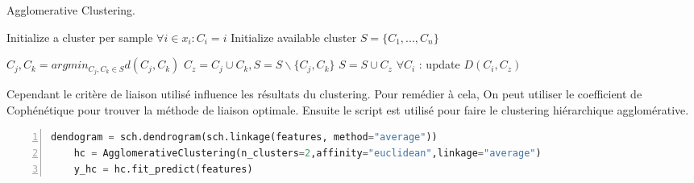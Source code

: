 \begin{algorithm}[H]
	\caption{Agglomerative Clustering.}
	\begin{algorithmic}[1]
	
		\State Initialize a cluster per sample $ \forall i \in x_{i} : C_{i} = i $
		\State Initialize available cluster $S = \{C_{1},...,C_{n}\}$
		
			\State $C_{j}, C_{k} = argmin_{C_{j},C_{k} \in S} d(C_{j}, C_{k})$  
			\State $C_{z} = C_{j} \cup C_{k}, S = S \backslash \{ C_{j},C_{k} \} $ 
				\State $S = S \cup C_{z}$
			\EndIf
			\State $\forall C_{i}$ : update $D(C_{i},C_{z})$ 
		\EndWhile 
	\EndProcedure
	
	\end{algorithmic}
\end{algorithm}

Cependant le critère de liaison utilisé influence les résultats du clustering. Pour remédier à cela, On peut utiliser le coefficient de Cophénétique pour trouver la méthode de liaison optimale. Ensuite le script est utilisé pour faire le clustering hiérarchique agglomérative.

\begin{lstlisting}[language=Python,label={pca_code}, basicstyle=\scriptsize, frame=l,framesep=4.5mm,framexleftmargin=2.5mm,tabsize=2,numbers=left,fillcolor=\color{blueforest!70},rulecolor=\color{blueforest},numberstyle=\normalfont\tiny\color{white}]
	dendogram = sch.dendrogram(sch.linkage(features, method="average"))
	hc = AgglomerativeClustering(n_clusters=2,affinity="euclidean",linkage="average")
	y_hc = hc.fit_predict(features)
\end{lstlisting}


